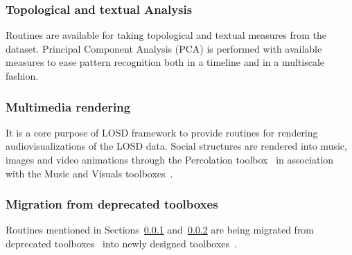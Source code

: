\documentclass[review]{elsarticle}
\begin{document}
\subsubsection{Topological and textual Analysis}\label{ana}
Routines are available for taking topological and textual measures from
the dataset.
Principal Component Analysis (PCA) is performed with available measures
to ease pattern recognition both in a timeline and in a multiscale
fashion.

\subsubsection{Multimedia rendering}\label{media}
It is a core purpose of LOSD framework to provide routines for rendering
audiovisualizations of the LOSD data.
Social structures are rendered into music, images and video animations
through the Percolation toolbox~\cite{percolation} in association with
the Music and Visuals toolboxes~\cite{music,visuals}.

\subsubsection{Migration from deprecated toolboxes}
Routines mentioned in Sections~\ref{ana} and~\ref{media} are being migrated from deprecated
toolboxes~\cite{gmaneLegacy,percolationLegacy} into newly designed
toolboxes~\cite{percolation,visuals}.
\end{document}
